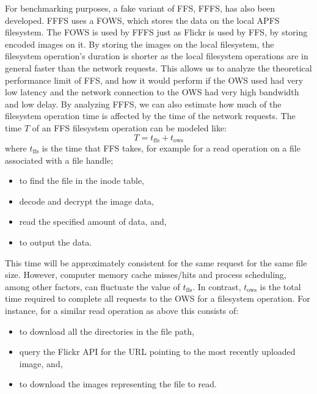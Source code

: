 For benchmarking purposes, a fake variant of \gls{FFS}, \gls{FFFS}, has also been developed. \gls{FFFS} uses a \gls{FOWS}, which stores the data on the local \gls{APFS} filesystem. The \gls{FOWS} is used by \gls{FFFS} just as Flickr is used by \gls{FFS}, by storing encoded images on it. By storing the images on the local filesystem, the filesystem operation's duration is shorter as the local filesystem operations are in general faster than the network requests. This allows us to analyze the theoretical performance limit of \gls{FFS}, and how it would perform if the \gls{OWS} used had very low latency and the network connection to the \gls{OWS} had very high bandwidth and low delay. By analyzing \gls{FFFS}, we can also estimate how much of the filesystem operation time is affected by the time of the network requests. The time $T$ of an \gls{FFS} filesystem operation can be modeled like:
$$
	T = t_\text{ffs} + t_\text{ows}
$$
where $t_\text{ffs}$ is the time that \gls{FFS} takes, for example for a read operation on a file associated with a file handle;
\begin{itemize}
	\item to find the file in the inode table,
	\item decode and decrypt the image data,
	\item read the specified amount of data, and,
	\item to output the data.
\end{itemize}
This time will be approximately consistent for the same request for the same file size. However, computer memory cache misses/hits and process scheduling, among other factors, can fluctuate the value of $t_\text{ffs}$. In contrast, $t_\text{ows}$ is the total time required to complete all requests to the \gls{OWS} for a filesystem operation. For instance, for a similar read operation as above this consists of:
\begin{itemize}
	\item to download all the directories in the file path,
	\item query the Flickr \gls{API} for the URL pointing to the most recently uploaded image, and,
	\item to download the images representing the file to read.
\end{itemize}
